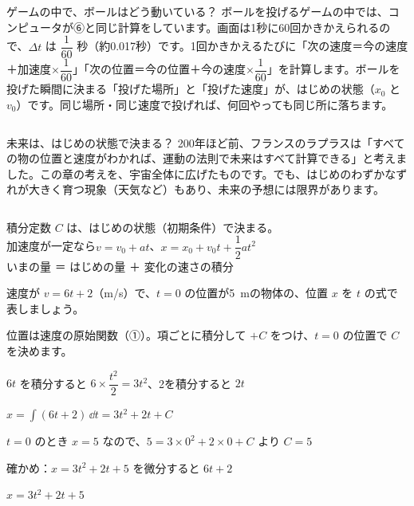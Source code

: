 \begin{column}{ゲームの中で、ボールはどう動いている？}
ボールを投げるゲームの中では、コンピュータが⑥と同じ計算をしています。画面は1秒に60回かきかえられるので、$\Delta t$ は $\dfrac{1}{60}$ 秒（約0.017秒）です。1回かきかえるたびに「次の速度＝今の速度＋加速度×$\dfrac{1}{60}$」「次の位置＝今の位置＋今の速度×$\dfrac{1}{60}$」を計算します。ボールを投げた瞬間に決まる「投げた場所」と「投げた速度」が、はじめの状態（$x_0$ と $v_0$）です。同じ場所・同じ速度で投げれば、何回やっても同じ所に落ちます。
\end{column}

\begin{column}{未来は、はじめの状態で決まる？}
200年ほど前、フランスのラプラスは「すべての物の位置と速度がわかれば、運動の法則で未来はすべて計算できる」と考えました。この章の考えを、宇宙全体に広げたものです。でも、はじめのわずかなずれが大きく育つ現象（天気など）もあり、未来の予想には限界があります。
\end{column}

\begin{taisetsu}
積分定数 $C$ は、はじめの状態（初期条件）で決まる。\\
加速度が一定なら\quad $v=v_0+at$、\quad $x=x_0+v_0t+\dfrac{1}{2}at^2$\\
いまの量 ＝ はじめの量 ＋ 変化の速さの積分
\end{taisetsu}

\begin{kotoba}
\small
{}
\end{kotoba}


\begin{reidai}
速度が $v=6t+2$（m/s）で、$t=0$ の位置が\qty{5}{m}の物体の、位置 $x$ を $t$ の式で表しましょう。\par
\kangaekata 位置は速度の原始関数（①）。項ごとに積分して $+C$ をつけ、$t=0$ の位置で $C$ を決めます。\par
\shiki $6t$ を積分すると $6\times\dfrac{t^2}{2}=3t^2$、2を積分すると $2t$\par
\hspace*{2.6\zw}$\displaystyle x=\int(6t+2)\,\dd t=3t^2+2t+C$\par
\hspace*{2.6\zw}$t=0$ のとき $x=5$ なので、$5=3\times0^2+2\times0+C$ より $C=5$\par
\hspace*{2.6\zw}確かめ：$x=3t^2+2t+5$ を微分すると $6t+2$\par
\kotae $x=3t^2+2t+5$
\end{reidai}

